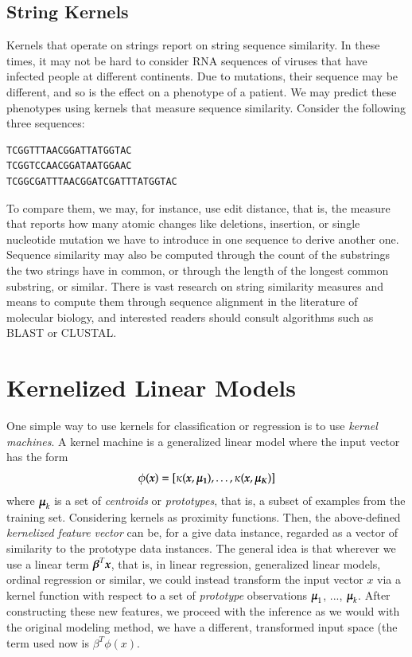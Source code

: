 \begin{refsection}
\subsection*{String Kernels}

Kernels that operate on strings report on string sequence similarity. In these times, it may not be hard to consider RNA sequences of viruses that have infected people at different continents. Due to mutations, their sequence may be different, and so is the effect on a phenotype of a patient. We may predict these phenotypes using kernels that measure sequence similarity. Consider the following three sequences:
\begin{verbatim}
TCGGTTTAACGGATTATGGTAC
TCGGTCCAACGGATAATGGAAC
TCGGCGATTTAACGGATCGATTTATGGTAC
\end{verbatim}
To compare them, we may, for instance, use edit distance, that is, the measure that reports how many atomic changes like deletions, insertion, or single nucleotide mutation we have to introduce in one sequence to derive another one. Sequence similarity may also be computed through the count of the substrings the two strings have in common, or through the length of the longest common substring, or similar. There is vast research on string similarity measures and means to compute them through sequence alignment in the literature of molecular biology, and interested readers should consult algorithms such as BLAST or CLUSTAL.

\section{Kernelized Linear Models}

One simple way to use kernels for classification or regression is to use {\em kernel machines}. A kernel machine is a generalized linear model where the input vector has the form
$$ \phi(\boldsymbol{x})=[\kappa(\boldsymbol{x},\boldsymbol{\mu_1}), \ldots, \kappa(\boldsymbol{x},\boldsymbol{\mu_K}) ] $$
where $\boldsymbol{\mu}_k$ is a set of {\em centroids} or {\em prototypes}, that is, a subset of examples from the training set. Considering kernels as proximity functions. Then, the above-defined {\em kernelized feature vector} can be, for a give data instance, regarded as a vector of similarity to the prototype data instances. The general idea is that wherever we use a linear term $\boldsymbol{\beta}^T\boldsymbol{x}$, that is, in linear regression, generalized linear models, ordinal regression or similar, we could instead transform the input vector $x$ via a kernel function with respect to a set of \emph{prototype} observations $\boldsymbol{\mu}_1$, ..., $\boldsymbol{\mu}_k$. After constructing these new features, we proceed with the inference as we would with the original modeling method, we have a different, transformed input space (the term used now is $\beta^T\phi(x)$.


\end{refsection}
